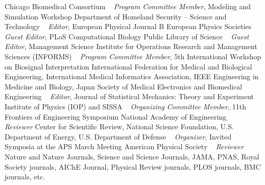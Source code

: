 Chicago Biomedical Consortium \newline
~
\Gap
{}
\textit{Program Committee Member}, Modeling and Simulation Workshop\newline
Department of Homeland Security -- Science and Technology \newline
~
\Gap
{}
\textit{Editor}, European Physical Journal B\newline
European Physics Societies \newline
~
\Gap
{}
\textit{Guest Editor}, PLoS Computational Biology\newline
Public Library of Science \newline
~
\Gap
{}
\textit{Guest Editor}, Management Science\newline
Institute for Operations Research and Management Sciences (INFORMS) \newline
~
\Gap
{}
\textit{Program Committee Member}, 5th International Workshop on Biosignal Interpretation\newline
International Federation for Medical and Biological Engineering, International Medical Informatics Association, IEEE Engineering in Medicine and Biology, Japan Society of Medical Electronics and Biomedical Engineering \newline
~
\Gap
{}
\textit{Editor}, Journal of Statistical Mechanics: Theory and Experiment\newline
Institute of Physics (IOP) and SISSA \newline
~
\Gap
{}
\textit{Organizing Committee Member}, 11th Frontiers of Engineering Symposium\newline
National Academy of Engineering \newline
~
\Gap
{}
\textit{Reviewer}
Center for Scientific Review, National Science Foundation, U.S. Department of Energy, U.S. Department of Defense \newline
~
\Gap
{}
\textit{Organizer}, Invited Symposia at the APS March Meeting \newline
American Physical Society \newline
~
\Gap
{}
\textit{Reviewer}
Nature and Nature Journals, Science and Science Journals, JAMA, PNAS, Royal Society journals, AIChE Journal, Physical Review journals, PLOS journals, BMC journals, etc. \newline
~
\Gap
\vspace*{0.2cm}